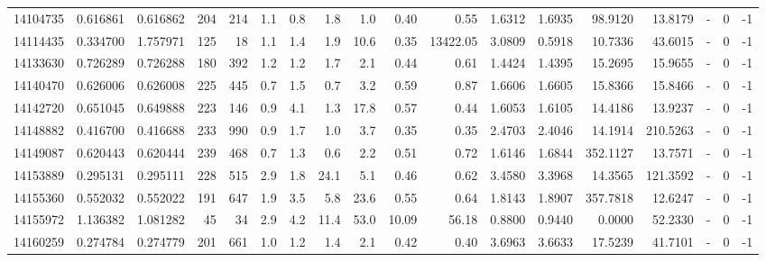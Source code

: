 \begin{tabular}{rrrrrrrrrrrrrrrlrr}
  14104735 & 0.616861 &   0.616862 &  204 &  214 &      1.1 &      0.8 &     1.8 &      1.0 &       0.40 &        0.55 &  1.6312 &  1.6935 &   98.9120 &   13.8179 &             - &        0 &         -1 \\
  14114435 & 0.334700 &   1.757971 &  125 &   18 &      1.1 &      1.4 &     1.9 &     10.6 &       0.35 &    13422.05 &  3.0809 &  0.5918 &   10.7336 &   43.6015 &             - &        0 &         -1 \\
  14133630 & 0.726289 &   0.726288 &  180 &  392 &      1.2 &      1.2 &     1.7 &      2.1 &       0.44 &        0.61 &  1.4424 &  1.4395 &   15.2695 &   15.9655 &             - &        0 &         -1 \\
  14140470 & 0.626006 &   0.626008 &  225 &  445 &      0.7 &      1.5 &     0.7 &      3.2 &       0.59 &        0.87 &  1.6606 &  1.6605 &   15.8366 &   15.8466 &             - &        0 &         -1 \\
  14142720 & 0.651045 &   0.649888 &  223 &  146 &      0.9 &      4.1 &     1.3 &     17.8 &       0.57 &        0.44 &  1.6053 &  1.6105 &   14.4186 &   13.9237 &             - &        0 &         -1 \\
  14148882 & 0.416700 &   0.416688 &  233 &  990 &      0.9 &      1.7 &     1.0 &      3.7 &       0.35 &        0.35 &  2.4703 &  2.4046 &   14.1914 &  210.5263 &             - &        0 &         -1 \\
  14149087 & 0.620443 &   0.620444 &  239 &  468 &      0.7 &      1.3 &     0.6 &      2.2 &       0.51 &        0.72 &  1.6146 &  1.6844 &  352.1127 &   13.7571 &             - &        0 &         -1 \\
  14153889 & 0.295131 &   0.295111 &  228 &  515 &      2.9 &      1.8 &    24.1 &      5.1 &       0.46 &        0.62 &  3.4580 &  3.3968 &   14.3565 &  121.3592 &             - &        0 &         -1 \\
  14155360 & 0.552032 &   0.552022 &  191 &  647 &      1.9 &      3.5 &     5.8 &     23.6 &       0.55 &        0.64 &  1.8143 &  1.8907 &  357.7818 &   12.6247 &             - &        0 &         -1 \\
  14155972 & 1.136382 &   1.081282 &   45 &   34 &      2.9 &      4.2 &    11.4 &     53.0 &      10.09 &       56.18 &  0.8800 &  0.9440 &    0.0000 &   52.2330 &             - &        0 &         -1 \\
  14160259 & 0.274784 &   0.274779 &  201 &  661 &      1.0 &      1.2 &     1.4 &      2.1 &       0.42 &        0.40 &  3.6963 &  3.6633 &   17.5239 &   41.7101 &             - &        0 &         -1 \\

\end{tabular}
